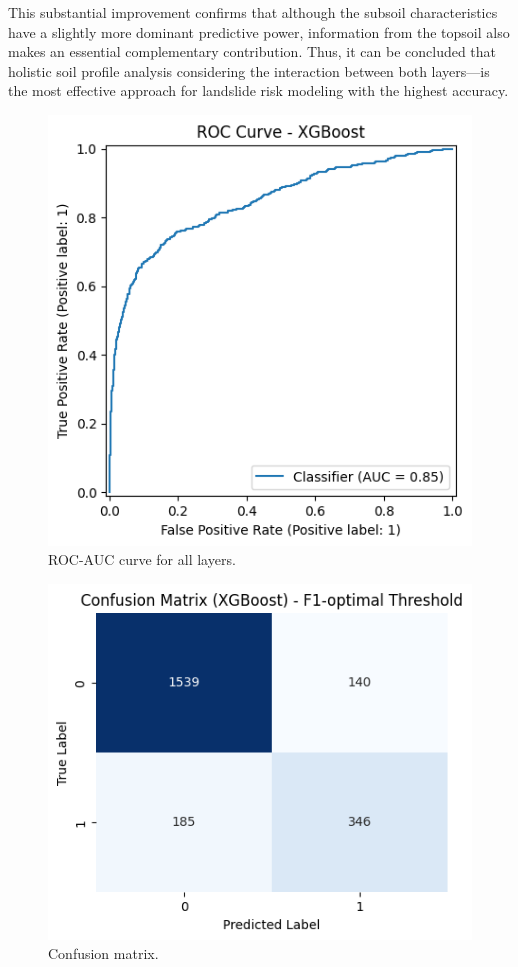 This substantial improvement confirms that although the subsoil characteristics have a slightly more dominant predictive power, information from the topsoil also makes an essential complementary contribution. Thus, it can be concluded that holistic soil profile analysis considering the interaction between both layers---is the most effective approach for landslide risk modeling with the highest accuracy.

\begin{figure}[htbp]
    \centerline{\includegraphics[width=\linewidth]{fig9.png}}
    \caption{ROC-AUC curve for all layers.}
    \label{fig:all-layers}
\end{figure}
\begin{figure}[htbp]
    \centerline{\includegraphics[width=\linewidth]{fig10.png}}
    \caption{Confusion matrix.}
    \label{fig:confusion-matrix}
\end{figure}

